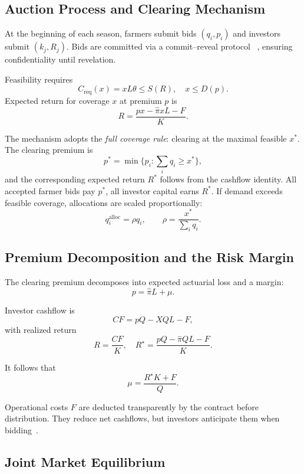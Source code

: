 \documentclass[11pt,a4paper]{article}
\begin{document}
    \subsection{Auction Process and Clearing Mechanism}\label{subsec:auction-process-and-clearing-mechanism}

    At the beginning of each season, farmers submit bids $(q_i, p_i)$ and investors submit $(k_j, R_j)$.
    Bids are committed via a commit--reveal protocol ~\parencite{blum1983coinflipping,buterin2015commit,parkes2014mechanism}, ensuring confidentiality until revelation.

    Feasibility requires
    \[
    C_{\mathrm{req}}(x) = xL\theta \leq S(R), \quad x \leq D(p).
    \]
    Expected return for coverage $x$ at premium $p$ is
    \[
    R = \frac{px - \hat{\pi}xL - F}{K}.
    \]

    The mechanism adopts the \emph{full coverage rule}: clearing at the maximal feasible $x^\ast$.
    The clearing premium is
    \[
    p^\ast = \min\{p_i : \sum_i q_i \geq x^\ast\},
    \]
    and the corresponding expected return $R^\ast$ follows from the cashflow identity.
    All accepted farmer bids pay $p^\ast$, all investor capital earns $R^\ast$.
    If demand exceeds feasible coverage, allocations are scaled proportionally:
    \[
    q_i^{\text{alloc}} = \rho q_i, \qquad \rho = \frac{x^\ast}{\sum_i q_i}.
    \]

    \subsection{Premium Decomposition and the Risk Margin}\label{subsec:premium-decomposition-and-the-risk-margin}

    The clearing premium decomposes into expected actuarial loss and a margin:
    \[
    p = \hat{\pi}L + \mu.
    \]

    Investor cashflow is
    \[
    CF = pQ - XQL - F,
    \]
    with realized return
    \[
    R = \frac{CF}{K}, \quad
    R^\star = \frac{pQ - \hat{\pi}QL - F}{K}.
    \]

    It follows that
    \[
    \mu = \frac{R^\star K + F}{Q}.
    \]

    Operational costs $F$ are deducted transparently by the contract before distribution.
        They reduce net cashflows, but investors anticipate them when bidding~\parencite{bowers1997actuarial}.

    \subsection{Joint Market Equilibrium}\label{subsec:joint-market-equilibrium}
\end{document}

